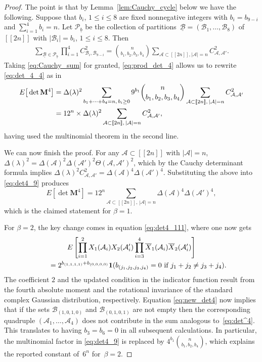 \documentclass[pdftex]{sigma}
\numberwithin{equation}{section}
\theoremstyle{definition}
\newcommand{\cP}{{\mathcal P}}
\newcommand{\ind}{{\bf{1}}}
\newcommand{\cB}{\mathcal{B}}
\newcommand{\cA}{\mathcal{A}}
\newcommand{\dd}{\Theta}
\newcommand{\lst}[1]{[\![#1 ]\!]}
\newcommand{\mbf}[1]{\mathbf{#1}}
\begin{document}
\begin{proof}
The point is that by Lemma~\ref{lem:Cauchy_cycle} below we have the following. Suppose that $b_i$, $1\le i\le 8$ are fixed nonnegative integers with $b_i=b_{9-i}$ and $\sum_{i=1}^4 b_i=n$. Let $\cP_{\underline{b}}$ be the collection of partitions~${\underline{\cB}=(\cB_1,\dots, \cB_8)}$ of $\lst{2n}$ with $|\cB_i|=b_i$, $1\le i\le 8$. Then
\begin{align}\label{eq:Cauchy_sum}
 \sum_{\underline{\cB}\in \cP_{\underline{b}}} \prod_{i=1}^4 C_{\cB_i,\cB_{9-i}}^2 =\binom{n}{b_1,b_2,b_3,b_4} \sum_{\cA\subset \lst{2n}, |\cA|=n} C_{\cA,\cA'}^2.
\end{align}
Taking \eqref{eq:Cauchy_sum} for granted, \eqref{eq:prod_det_4}
allows us to rewrite \eqref{eq:det_4_4}
as in
\begin{align}\notag
 E\big[ \det \mbf{M}^4\big]&=\Delta(\lambda)^2\sum_{b_1+\cdots+b_4=n,\, b_i\ge 0} 9^{b_1} \binom{n}{b_1,b_2,b_3,b_4} \sum_{\cA\subset \lst{2n},\, |\cA|=n} C_{\cA,\cA'}^2\\
 &=12^n \times \Delta(\lambda)^2 \sum_{\cA\subset \lst{2n},\, |\cA|=n} C_{\cA,\cA'}^2\label{eq:det4_9},
\end{align}
having used the multinomial theorem in the second line.

We can now finish the proof. For any $\cA\subset \lst{2n}$ with $|\cA|=n$,
$%
\Delta(\lambda)^2\!=\! \Delta(\cA)^2 \Delta(\cA')^2 \dd(\cA,\cA')^2$,
which by the Cauchy determinant formula implies
$
\Delta(\lambda)^2 C_{\cA,\cA'}^2= \Delta(\cA)^4 \Delta(\cA')^4$.
Substituting the above into \eqref{eq:det4_9} produces
\[
 E\left[ \det \mbf{M}^4\right]=12^n \sum_{\cA\subset \lst{2n},\, |\cA|=n} \Delta(\cA)^4 \Delta(\cA')^4,
\]
which is the claimed statement for $\beta=1$.

For $\beta =2$, the key change comes in equation \eqref{eq:det4_111}, where one now gets
\begin{gather}
E \left [\prod_{i=1}^2 X_1(\cA_i) X_2(\cA_i') \prod_{i=3}^4 \overline{X}_1(\cA_i) \overline{X}_2(\cA_i')\right]\nonumber\\
\qquad \notag=2^{b_{(1,1,1,1)}+b_{(0,0,0,0)}} \ind(b_{(j_1,j_2,j_3,j_4)}=0 \text{ if $j_1+j_2\neq j_3+j_4$}).\label{eq:new_det4}
\end{gather}
The coefficient $2$ and the updated condition in the indicator function result from the fourth absolute moment and the rotational invariance of the standard complex Gaussian distribution, respectively. Equation \eqref{eq:new_det4} now implies that if the sets $\cB_{(1,0,1,0)}$ and
$\cB_{(0,1,0,1)}$ are not empty then the corresponding quadruple $(\cA_1,\dots,\cA_4)$ does not contribute in the sum analogous to~\eqref{eq:det^4}. This translates to having $b_3=b_6=0$ in all subsequent calculations. In particular,
 the multinomial factor in \eqref{eq:det4_9} is replaced by $ 4^{b_1} \binom{n}{b_1,b_2,b_4}$, which
explains the reported constant of~$6^n$ for~${\beta=2}$.
\end{proof}
\end{document}
